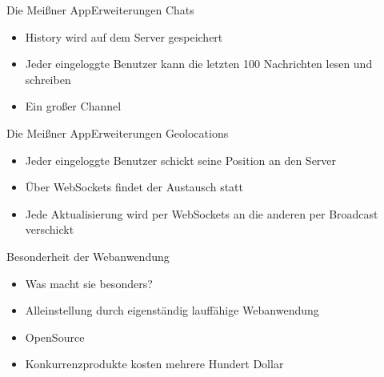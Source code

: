 \begin{frame}{Die Meißner App}{Erweiterungen}
	Chats
	\begin{itemize}
		\item History wird auf dem Server gespeichert
		\item Jeder eingeloggte Benutzer kann die letzten 100 Nachrichten lesen und schreiben
		\item Ein großer Channel
	\end{itemize}
\end{frame}

\begin{frame}{Die Meißner App}{Erweiterungen}
	Geolocations
	\begin{itemize}
		\item Jeder eingeloggte Benutzer schickt seine Position an den Server
		\item Über WebSockets findet der Austausch statt
		\item Jede Aktualisierung wird per WebSockets an die anderen per Broadcast verschickt
	\end{itemize}
\end{frame}

\begin{frame}{Besonderheit der Webanwendung}
	\begin{itemize}
		\item Was macht sie besonders?
		\item Alleinstellung durch eigenständig lauffähige Webanwendung
		\item OpenSource
		\item Konkurrenzprodukte kosten mehrere Hundert Dollar
	\end{itemize}
\end{frame}